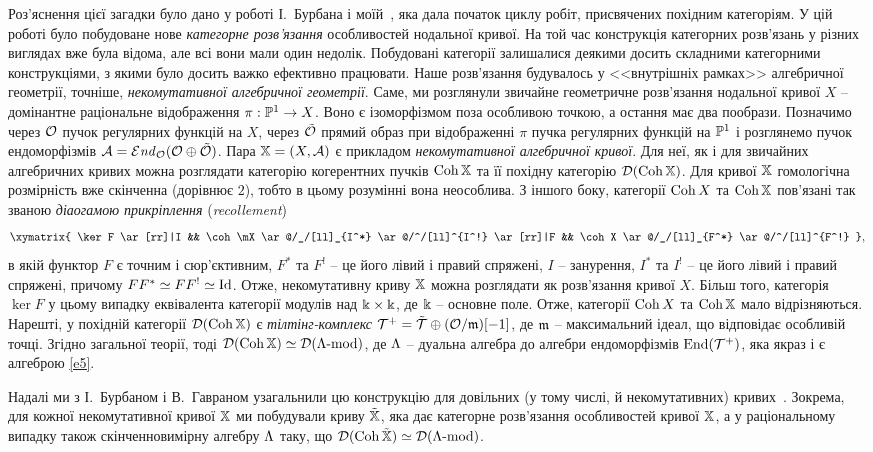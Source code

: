 Роз'яснення цієї загадки було дано у роботі І.~Бурбана і моїй~\cite{BDder}, яка дала початок циклу робіт, присвячених похідним категоріям.
У цій роботі було побудоване нове \emph{категорне розв'язання} особливостей нодальної кривої. 
На той час конструкція категорних розв'язань у різних виглядах вже була відома, але всі вони мали один недолік. 
Побудовані категорії залишалися деякими досить складними категорними конструкціями, з якими було досить важко ефективно працювати. 
Наше розв'язання будувалось у <<внутрішніх рамках>>  алгебричної геометрії, точніше, \emph{некомутативної алгебричної геометрії}.
Саме, ми розглянули звичайне геометричне розв'язання нодальної кривої $X$ -- домінантне раціональне відображення $\pi:\mathbb{P}^1\to X$. 
Воно є ізоморфізмом поза особливою точкою, а остання має два пообрази. 
Позначимо через $\mathcal{O}$ пучок регулярних функцій на $X$, через $\tilde{\mathcal{O}}$ прямий образ при відображенні $\pi$ пучка регулярних функцій на $\mathbb{P}^1$ і розглянемо пучок ендоморфізмів $\mathcal{A}=\mathop{\mathcal{E}\mathit{nd}}\nolimits_{\mathcal{O}}(\mathcal{O}\oplus\tilde{\mathcal{O}})$. 
Пара $\mathbb{X}=(X,\mathcal{A})$ є прикладом \emph{некомутативної алгебричної кривої}.
Для неї, як і для звичайних алгебричних кривих можна розглядати категорію когерентних пучків $\mathop\mathrm{Coh}\nolimits\mathbb{X}$ та її похідну категорію $\mathcal{D}(\mathop\mathrm{Coh}\nolimits\mathbb{X})$. 
Для кривої $\mathbb{X}$ гомологічна розмірність вже скінченна (дорівнює $2$), тобто в цьому розумінні вона неособлива.
З іншого боку, категорії $\mathop\mathrm{Coh}\nolimits X$ та $\mathop\mathrm{Coh}\nolimits\mathbb{X}$ пов'язані так званою \emph{діаогамою прикріплення} (\emph{recollement})
\[
\xymatrix{ \ker F \ar[rr]|I && \coh\mX \ar@/_/[ll]_{I^*} \ar@/^/[ll]^{I^!} \ar[rr]|F && \coh X \ar@/_/[ll]_{F^*} \ar@/^/[ll]^{F^!}      },
\]
в якій функтор $F$ є точним і сюр'єктивним, $F^*$ та $F^!$ -- це його лівий і правий спряжені, $I$ -- занурення,  $I^*$ та $I^!$ --
це його лівий і правий спряжені, причому $FF^*\simeq FF^!\simeq \mathrm{Id}$. Отже, некомутативну криву $\mathbb{X}$ можна розглядати як
розв'язання кривої $X$. Більш того, категорія $\ker F$ у цьому випадку еквівалента категорії  модулів над $\Bbbk\times\Bbbk$, де $\Bbbk$
-- основне поле. Отже, категорії $\mathop\mathrm{Coh}\nolimits X$ та $\mathop\mathrm{Coh}\nolimits\mathbb{X}$ мало відрізняються. Нарешті, у похідній категорії $\mathcal{D}(\mathop\mathrm{Coh}\nolimits\mathbb{X})$ є
\emph{тілтінг-комплекс} $\mathcal{T}^+=\tilde{\mathcal{T}}\oplus(\mathcal{O}/\mathfrak{m})[-1]$, де $\mathfrak{m}$ -- максимальний ідеал, що відповідає особливій точці.  Згідно загальної
теорії, тоді $\mathcal{D}(\mathop\mathrm{Coh}\nolimits\mathbb{X})\simeq\mathcal{D}(\Lambda\mbox{-}\mathrm{mod})$, де $\Lambda$ -- дуальна алгебра до алгебри ендоморфізмів $\mathop\mathrm{End}\nolimits(\mathcal{T}^+)$, яка якраз і є
алгеброю \eqref{e5}.

Надалі ми з І.~Бурбаном і В.~Гавраном узагальнили цю конструкцію для довільних (у тому числі, й некомутативних) кривих~\cite{BDG}. 
Зокрема, для кожної некомутативної кривої $\mathbb{X}$ ми побудували криву $\tilde{\mathbb{X}}$, яка дає категорне розв'язання особливостей кривої $\mathbb{X}$, а у раціональному випадку також скінченновимірну алгебру $\Lambda$ таку, що $\mathcal{D}(\mathop\mathrm{Coh}\nolimits\tilde{\mathbb{X}})\simeq\mathcal{D}(\Lambda\mbox{-}\mathrm{mod})$.

